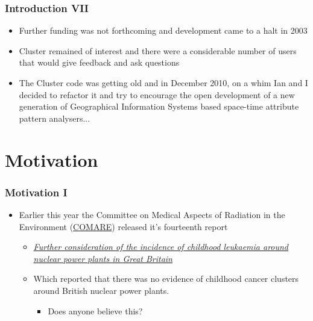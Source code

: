 \documentclass{beamer}
\begin{document}
\begin{frame}[t]
\frametitle{Introduction VII}
\begin{itemize}
  \item Further funding was not forthcoming and development came to a halt in 2003
  \item Cluster remained of interest and there were a considerable number of users that would give feedback and ask questions
  \item The Cluster code was getting old and in December 2010, on a whim Ian and I decided to refactor it and try to encourage the open development of a new generation of Geographical Information Systems based space-time attribute pattern analysers...
\end{itemize}
\end{frame}


\section{Motivation}

\begin{frame}[t]
\frametitle{Motivation I}
\begin{itemize}
  \item Earlier this year the Committee on Medical Aspects of Radiation in the Environment (\href{http://www.comare.org.uk/}{COMARE}) released it's fourteenth report
  \begin{itemize}
    \item \href{http://www.comare.org.uk/press_releases/documents/COMARE14report.pdf}{\textit{Further consideration of the incidence of childhood leukaemia around nuclear power plants in Great Britain}}
    \item Which reported that there was no evidence of childhood cancer clusters around British nuclear power plants.
    \begin{itemize}
      \item Does anyone believe this?
    \end{itemize}
  \end{itemize}
\end{itemize}
\end{frame}
\end{document}
